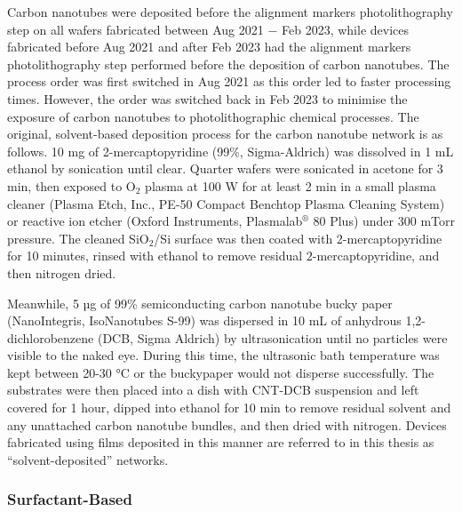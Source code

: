 \documentclass[
  a4paper,
]{scrbook}
\begin{document}
Carbon nanotubes were deposited before the alignment markers
photolithography step on all wafers fabricated between Aug 2021 \(-\)
Feb 2023, while devices fabricated before Aug 2021 and after Feb 2023
had the alignment markers photolithography step performed before the
deposition of carbon nanotubes. The process order was first switched in
Aug 2021 as this order led to faster processing times. However, the
order was switched back in Feb 2023 to minimise the exposure of carbon
nanotubes to photolithographic chemical processes. The original,
solvent-based deposition process for the carbon nanotube network is as
follows. 10 mg of 2-mercaptopyridine (99\%, Sigma-Aldrich) was dissolved
in 1 mL ethanol by sonication until clear. Quarter wafers were sonicated
in acetone for 3 min, then exposed to O\(_2\) plasma at 100 W for at
least 2 min in a small plasma cleaner (Plasma Etch, Inc., PE-50 Compact
Benchtop Plasma Cleaning System) or reactive ion etcher (Oxford
Instruments, Plasmalab\(^\circledR\) 80 Plus) under 300 mTorr pressure.
The cleaned SiO\(_2\)/Si surface was then coated with 2-mercaptopyridine
for 10 minutes, rinsed with ethanol to remove residual
\(2\)-mercaptopyridine, and then nitrogen dried.

Meanwhile, 5 µg of 99\% semiconducting carbon nanotube bucky paper
(NanoIntegris, IsoNanotubes S-99) was dispersed in 10 mL of anhydrous
1,2-dichlorobenzene (DCB, Sigma Aldrich) by ultrasonication until no
particles were visible to the naked eye. During this time, the
ultrasonic bath temperature was kept between 20-30 °C or the buckypaper
would not disperse successfully. The substrates were then placed into a
dish with CNT-DCB suspension and left covered for 1 hour, dipped into
ethanol for 10 min to remove residual solvent and any unattached carbon
nanotube bundles, and then dried with nitrogen. Devices fabricated using
films deposited in this manner are referred to in this thesis as
``solvent-deposited'' networks.

\hypertarget{surfactant-based}{%
\subsubsection*{Surfactant-Based}\label{surfactant-based}}
\end{document}
